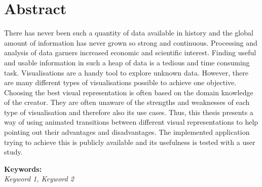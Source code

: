 \section*{Abstract}

There has never been such a quantity of data available in history and the global amount of information has never grown so strong and continuous. Processing and analysis of data garners increased economic and scientific interest. Finding useful and usable information in such a heap of data is a tedious and time consuming task. Visualisations are a handy tool to explore unknown data. However, there are many different types of visualisations possible to achieve one objective. Choosing the best visual representation is often based on the domain knowledge of the creator. They are often unaware of the strengths and weaknesses of each type of visualisation and therefore also its use cases. Thus, this thesis presents a way of using animated transitions between different visual representations to help pointing out their advantages and disadvantages. The implemented application trying to achieve this is publicly available and its usefulness is tested with a user study.


\textbf{Keywords:}\\
\textit{Keyword 1, Keyword 2}